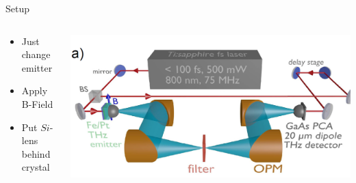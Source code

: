 \documentclass[aspectratio=1610, 9pt]{beamer}
\begin{document}
\begin{frame}{Setup}
  \begin{center}
    \begin{columns}
      \begin{column}{0.3\textwidth}
        \begin{itemize}
          \item Just change emitter
          \vspace{0.3in}
          \item Apply B-Field
          \vspace{0.3in}
          \item Put $Si$-lens behind crystal
        \end{itemize}
      \end{column}
      \begin{column}{.6\textwidth}
        \begin{center}
          \includegraphics[width=\textwidth]{pics/setup.png}
        \end{center}
      \end{column}
    \end{columns}
  \end{center}
\end{frame}
\end{document}
